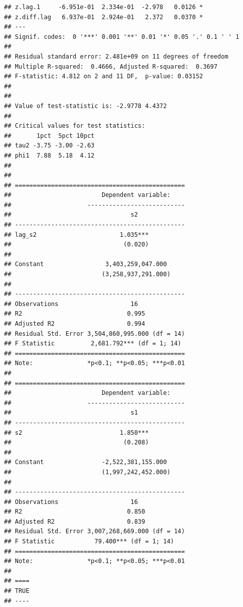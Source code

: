 \documentclass[
]{article}
\begin{document}
\begin{verbatim}
## z.lag.1     -6.951e-01  2.334e-01  -2.978   0.0126 *
## z.diff.lag   6.937e-01  2.924e-01   2.372   0.0370 *
## ---
## Signif. codes:  0 '***' 0.001 '**' 0.01 '*' 0.05 '.' 0.1 ' ' 1
## 
## Residual standard error: 2.481e+09 on 11 degrees of freedom
## Multiple R-squared:  0.4666, Adjusted R-squared:  0.3697 
## F-statistic: 4.812 on 2 and 11 DF,  p-value: 0.03152
## 
## 
## Value of test-statistic is: -2.9778 4.4372 
## 
## Critical values for test statistics: 
##       1pct  5pct 10pct
## tau2 -3.75 -3.00 -2.63
## phi1  7.88  5.18  4.12
## 
## 
## ===============================================
##                         Dependent variable:    
##                     ---------------------------
##                                 s2             
## -----------------------------------------------
## lag_s2                       1.035***          
##                               (0.020)          
##                                                
## Constant                 3,403,259,047.000     
##                         (3,258,937,291.000)    
##                                                
## -----------------------------------------------
## Observations                    16             
## R2                             0.995           
## Adjusted R2                    0.994           
## Residual Std. Error 3,504,860,995.000 (df = 14)
## F Statistic          2,681.792*** (df = 1; 14) 
## ===============================================
## Note:               *p<0.1; **p<0.05; ***p<0.01
## 
## ===============================================
##                         Dependent variable:    
##                     ---------------------------
##                                 s1             
## -----------------------------------------------
## s2                           1.850***          
##                               (0.208)          
##                                                
## Constant                -2,522,381,155.000     
##                         (1,997,242,452.000)    
##                                                
## -----------------------------------------------
## Observations                    16             
## R2                             0.850           
## Adjusted R2                    0.839           
## Residual Std. Error 3,007,268,669.000 (df = 14)
## F Statistic           79.400*** (df = 1; 14)   
## ===============================================
## Note:               *p<0.1; **p<0.05; ***p<0.01
## 
## ====
## TRUE
## ----
\end{verbatim}
\end{document}
